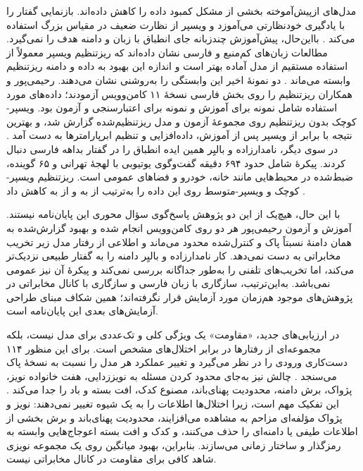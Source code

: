 مدل‌های ازپیش‌آموخته بخشی از مشکل کمبود داده را کاهش داده‌اند.  بازنمایی گفتار را با یادگیری خودنظارتی می‌آموزد و ویسپر از نظارت ضعیف در مقیاس بزرگ استفاده می‌کند . بااین‌حال، پیش‌آموزش چندزبانه جای انطباق با زبان و دامنه هدف را نمی‌گیرد. مطالعات زبان‌های کم‌منبع و فارسی نشان داده‌اند که ریزتنظیم ویسپر معمولاً از استفاده مستقیم از مدل آماده بهتر است و اندازه این بهبود به داده و دامنه ریزتنظیم وابسته می‌ماند .
دو نمونهٔ اخیر این وابستگی را به‌روشنی نشان می‌دهند. رحیمی‌پور و همکاران ریزتنظیم را روی بخش فارسی نسخهٔ ۱۱ کامن‌وویس آزمودند؛ داده‌های مورد استفاده شامل  نمونه برای آموزش و  نمونه برای اعتبارسنجی و آزمون بود.  ویسپر-کوچک بدون ریزتنظیم روی مجموعهٔ آزمون  و مدل  ریزتنظیم‌شده  گزارش شد، و بهترین نتیجه با  برابر  از ویسپر پس از آموزش، داده‌افزایی و تنظیم ابرپارامترها به دست آمد . در سوی دیگر، نامدارزاده و بالیِر همین ایده انطباق را در گفتار بداهه فارسی دنبال کردند. پیکرهٔ  شامل حدود ۶۹۴ دقیقه گفت‌وگوی یوتیوبی با لهجهٔ تهرانی و ۶۵ گوینده، ضبط‌شده در محیط‌هایی مانند خانه، خودرو و فضاهای عمومی است. ریزتنظیم ویسپر-کوچک و ویسپر-متوسط روی این داده  را به‌ترتیب از  به  و از  به  کاهش داد .

 
با این حال، هیچ‌یک از این دو پژوهش پاسخ‌گوی سؤال محوری این پایان‌نامه نیستند. آموزش و آزمون رحیمی‌پور هر دو روی کامن‌وویس انجام شده و بهبود گزارش‌شده به همان دامنهٔ نسبتاً پاک و کنترل‌شده محدود می‌ماند و اطلاعی از رفتار مدل زیر تخریب مخابراتی به دست نمی‌دهد. کار نامدارزاده و بالیِر دامنه را به گفتار طبیعی نزدیک‌تر می‌کند، اما تخریب‌های تلفنی را به‌طور جداگانه بررسی نمی‌کند و پیکرهٔ آن نیز عمومی نمی‌باشد. به‌این‌ترتیب، سازگاری با زبان فارسی و سازگاری با کانال مخابراتی در پژوهش‌های موجود هم‌زمان مورد آزمایش قرار نگرفته‌اند؛ همین شکاف مبنای طراحی آزمایش‌های بعدی این پایان‌نامه است.



در ارزیابی‌های جدید، «مقاومت» یک ویژگی کلی و تک‌عددی برای مدل نیست، بلکه مجموعه‌ای از رفتارها در برابر اختلال‌های مشخص است.  برای این منظور ۱۱۴ دست‌کاری ورودی را در نظر می‌گیرد و تغییر عملکرد هر مدل را نسبت به نسخهٔ پاک می‌سنجد . چالش  نیز به‌جای محدود کردن مسئله به نویززدایی، هفت خانواده نویز، پژواک، برش دامنه، محدودیت پهنای‌باند، مصنوع کدک، افت بسته و باد را جدا می‌کند . این تفکیک مهم است، زیرا اختلال‌ها اطلاعات را به یک شیوه تغییر نمی‌دهند: نویز و پژواک مؤلفه‌ای مزاحم به مشاهده می‌افزایند، محدودیت پهنای‌باند و برش بخشی از اطلاعات طیفی یا دامنه‌ای را حذف می‌کنند، و کدک و افت بسته اعوجاج‌هایی وابسته به رمزگذار و ساختار زمانی می‌سازند. بنابراین، بهبود میانگین روی یک مجموعه نویزی شاهد کافی برای مقاومت در کانال مخابراتی نیست.

